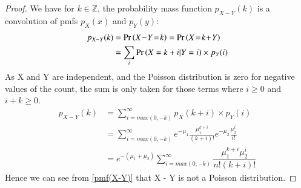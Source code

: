 \documentclass[journal,12pt,twocolumn]{IEEEtran}
\begin{document}
    \begin{proof}
         We have for $k \in \mathbb{Z}$, the probability mass function $p_{X-Y}(k)$ is a convolution of pmfs $p_X(x)$ and $p_Y(y)$: 
    \begin{align}
       p_{X-Y}(k) &= \pr{X\! -\! Y\! =\! k} = \pr{X\! =\! k\! +\! Y}\\
       &= \sum_{i}\pr{X = k + i| Y = i}\times p_Y(i)\label{p_(x-y)}
    \end{align}
    As X and Y are independent, and the Poisson distribution is zero for negative values of the count, the sum is only taken for those terms where $i \geq 0$ and $i+k\geq 0$. 
    \begin{align}
        p_{X-Y}(k) &= \sum_{i=max(0, -k)}^\infty p_X(k+i) \times p_Y(i)\\
        &=\sum_{i=max(0, -k)}^\infty e^{-\mu_1}\frac{\mu_1^{k+i}}{(k+i)!}e^{-\mu_2}\frac{\mu_2^i}{i!}\\
        &= e^{-(\mu_1 + \mu_2)}\sum_{i=max(0, -k)}^\infty \dfrac{\mu _{1}^{k+i}\mu _{2}^{i}}{n!(k+i)!}\label{pmf(X-Y)}
    \end{align}
    Hence we can see from \eqref{pmf(X-Y)} that X - Y is not a Poisson distribution.
    \end{proof}
    
\end{document}

